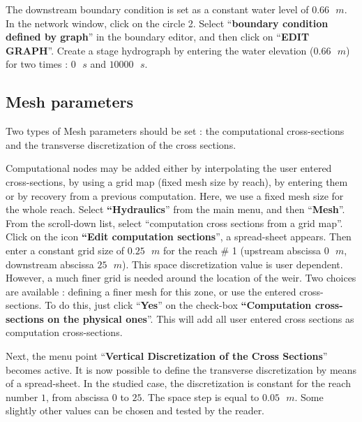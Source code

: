 \documentclass[a4paper,12pt]{article}
\begin{document}
The downstream boundary condition is set as a constant water
level of $0.66\mbox{ }m$. In the network window, click on the circle 2. Select {}``\textbf{boundary condition defined
by graph}'' in the boundary editor, and then click on {}``\textbf{EDIT
GRAPH}''. Create a stage hydrograph by entering the water elevation ($0.66\mbox{ }m$) for two times : $0\mbox{ }s$ and
$10000\mbox{ }s$.


\subsection{Mesh parameters}

\hspace{0.5cm} Two types of Mesh parameters should be set : the
computational cross-sections and the transverse discretization of the
cross sections. 

\vspace{0.5cm}

Computational nodes may be added either by interpolating the user entered cross-sections, by using a grid map (fixed mesh size by reach), by entering them or by recovery from a previous computation. Here, we use a fixed mesh size for
the whole reach. Select \textbf{{}``Hydraulics}''
from the main menu, and then {}``\textbf{Mesh}''. From the scroll-down
list, select {}``computation cross sections from a grid map''. Click
on the icon \textbf{{}``Edit computation sections}'', a spread-sheet
appears. Then enter a constant grid size of $0.25\mbox{ }m$ for the reach \# 1 (upstream abscissa $0\mbox{ }m$, downstream
abscissa $25\mbox{ }m$). This space discretization value is user dependent. However, a much finer grid is needed around the location of the weir. Two choices are available : defining a finer mesh for this zone, or use
the entered cross-sections. To do this, just click {}``\textbf{Yes}'' on the check-box
\textbf{{}``Computation cross-sections on the physical ones}''.
This will add all user entered cross sections as computation cross-sections.

\vspace{0.5cm}

Next, the menu point {}``\textbf{Vertical Discretization
of the Cross Sections}'' becomes active. It is now possible to define
the transverse discretization by means of a spread-sheet. In the studied
case, the discretization is constant for the reach number
$1$, from abscissa $0$ to $25$. The space step is equal to $0.05\mbox{ }m$. Some slightly other values can be chosen and tested by the reader. 
\end{document}

